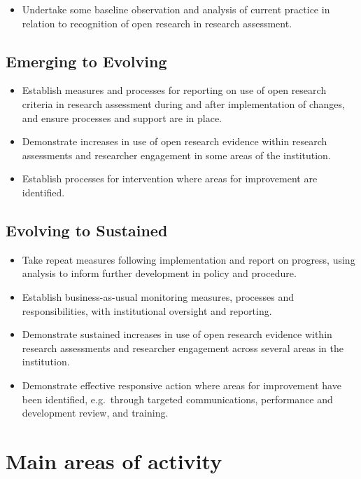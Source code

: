 \documentclass[
  letterpaper,
  DIV=11,
  numbers=noendperiod,
  oneside]{scrreprt}
\providecommand{\tightlist}{%
  \setlength{\itemsep}{0pt}\setlength{\parskip}{0pt}}\usepackage{longtable,booktabs,array}
\begin{document}
\begin{itemize}
\tightlist
\item
  Undertake some baseline observation and analysis of current practice
  in relation to recognition of open research in research assessment.
\end{itemize}

\subsection{Emerging to Evolving}\label{emerging-to-evolving-7}

\begin{itemize}
\item
  Establish measures and processes for reporting on use of open research
  criteria in research assessment during and after implementation of
  changes, and ensure processes and support are in place.
\item
  Demonstrate increases in use of open research evidence within research
  assessments and researcher engagement in some areas of the
  institution.
\item
  Establish processes for intervention where areas for improvement are
  identified.
\end{itemize}

\subsection{Evolving to Sustained}\label{evolving-to-sustained-7}

\begin{itemize}
\item
  Take repeat measures following implementation and report on progress,
  using analysis to inform further development in policy and procedure.
\item
  Establish business-as-usual monitoring measures, processes and
  responsibilities, with institutional oversight and reporting.
\item
  Demonstrate sustained increases in use of open research evidence
  within research assessments and researcher engagement across several
  areas in the institution.
\item
  Demonstrate effective responsive action where areas for improvement
  have been identified, e.g.~through targeted communications,
  performance and development review, and training.
\end{itemize}

\section{Main areas of activity}\label{main-areas-of-activity-7}
\end{document}
